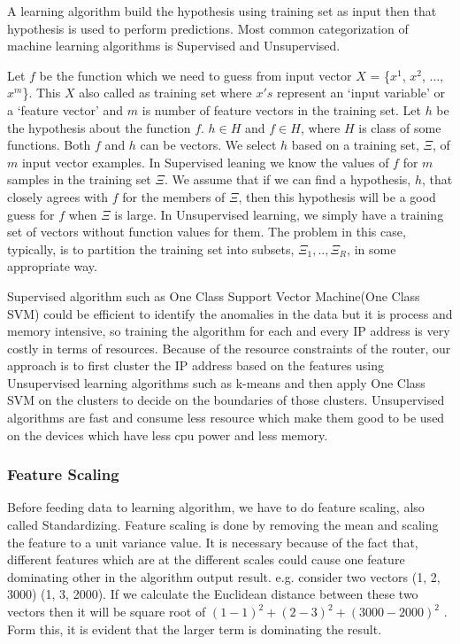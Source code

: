 \documentclass[10pt,oneside,a4paper]{article}
\begin{document}
A learning algorithm build the hypothesis using training set as input then that hypothesis is used to perform predictions. Most common categorization of machine learning algorithms is Supervised and Unsupervised.

Let $f$ be the function which we need to guess from input vector $X$ = \{$x^{1}$, $x^{2}$, ..., $x^{m}$\}. This $X$ also called as training set where $x's$ represent an `input variable' or a `feature vector' and $m$ is number of feature vectors in the training set. Let $h$ be the hypothesis about the function $f$. $h \in H$ and $f \in H$, where $H$ is class of some functions. Both $f$ and $h$ can be vectors. We select $h$ based on a training set, $\Xi$, of $m$ input vector examples. In Supervised leaning we know the values of $f$ for $m$ samples in the training set
$\Xi$. We assume that if we can find a hypothesis, $h$, that closely agrees with $f$ for the members of $\Xi$, then this hypothesis will be a good guess for $f$ when $\Xi$ is large. In Unsupervised learning, we simply have a training set of vectors without function values for them. The problem in this case, typically, is to partition the training set into subsets, $\Xi_1,.. ,\Xi_R$, in some appropriate way.\cite{machineLearning}

Supervised algorithm such as One Class Support Vector Machine(One Class SVM)\cite{SVM} could be efficient to identify the anomalies in the data but it is process and memory intensive, so training the algorithm for each and every IP address is very costly in terms of resources. Because of the resource constraints of the router, our approach is to first cluster the IP address based on the features using Unsupervised learning algorithms such as k-means and then apply One Class SVM on the clusters to decide on the boundaries of those clusters. Unsupervised algorithms are fast and consume less resource which make them good to be used on the devices which have less cpu power and less memory.

\subsubsection{Feature Scaling}

Before feeding data to learning algorithm, we have to do feature scaling, also called Standardizing. Feature scaling is done by removing the mean and scaling the feature to a unit variance value. It is necessary because of the fact that, different features which are at the different scales could cause one feature dominating other in the algorithm output result. e.g. consider two vectors (1, 2, 3000) (1, 3, 2000). If we calculate the Euclidean distance between these two vectors then it will be square root of $(1-1)^2 + (2-3)^2 + (3000-2000)^2$ . Form this, it is evident that the larger term is dominating the result.
\end{document}
